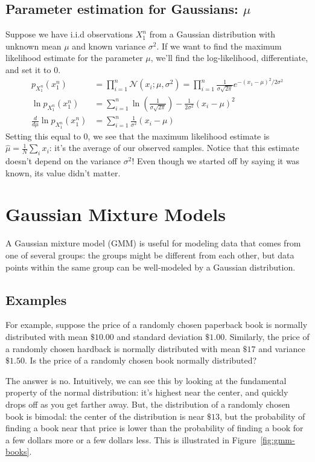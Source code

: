 \documentclass[12pt]{article}
\newcommand{\N}{\mathcal{N}}
\begin{document}
    \subsection{Parameter estimation for Gaussians: $\mu$}
    \label{sec:gaussian-param}
    Suppose we have i.i.d observations $X_1^n$ from a Gaussian distribution
    with unknown mean $\mu$ and known variance $\sigma^2$. If we want to find
    the maximum likelihood estimate for the parameter $\mu$, we'll find the
    log-likelihood, differentiate, and set it to 0.
    \begin{align*}
        p_{X_1^n}(x_1^n)
            &= \prod_{i=1}^n \N(x_i ; \mu, \sigma^2) 
            = \prod_{i=1}^n \frac{1}{\sigma \sqrt{2\pi}} e^{-(x_1-\mu)^2/2\sigma^2} \\
        \ln p_{X_1^n}(x_1^n)
        &= \sum_{i=1}^n \ln\left(\frac{1}{\sigma \sqrt{2\pi}}\right) - \frac{1}{2\sigma^2}(x_i - \mu)^2 \\
        \frac{d}{d\mu} \ln p_{X_1^n}(x_1^n) 
        &= \sum_{i=1}^n \frac{1}{\sigma^2}(x_i - \mu)
    \end{align*}
    Setting this equal to 0, we see that the maximum likelihood estimate is
    $\widehat{\mu} = \frac{1}{N}\sum_i x_i$: it's the average of our observed
    samples. Notice that this estimate doesn't depend on the variance
    $\sigma^2$! Even though we started off by saying it was known, its value
    didn't matter.

    \section{Gaussian Mixture Models}

    A Gaussian mixture model (GMM) is useful for modeling data that comes from
    one of several groups: the groups might be different from each
    other, but data points within the same group can be well-modeled by a
    Gaussian distribution.

    \subsection{Examples}
    For example, suppose the price of a randomly chosen paperback book is
    normally distributed with mean $\$10.00$ and standard deviation $\$1.00$.
    Similarly, the price of a randomly chosen hardback is normally distributed
    with mean $\$17$ and variance $\$1.50$. Is the price of a randomly chosen
    book normally distributed?

    The answer is no. Intuitively, we can see this by looking at the
    fundamental property of the normal distribution: it's highest near the
    center, and quickly drops off as you get farther away.  But, the
    distribution of a randomly chosen book is bimodal: the center of the
    distribution is near $\$13$, but the probability of finding a book near
    that price is lower than the probability of finding a book for a few
    dollars more or a few dollars less. This is illustrated in
    Figure~\ref{fig:gmm-books}.
\end{document}
